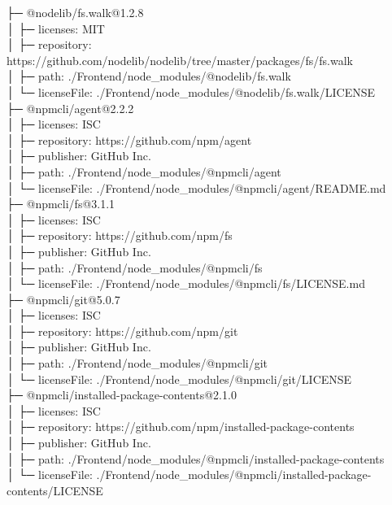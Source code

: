 \documentclass[
    paper=a4,
    twoside=false,
    parskip=half,
    listof=entryprefix,
    listof=totoc,
    index=totoc,
    bibliography=totoc,
    headsepline,
]{scrbook}
\begin{document}
    ├─ @nodelib/fs.walk@1.2.8\\
    │  ├─ licenses: MIT\\
    │  ├─ repository: https://github.com/nodelib/nodelib/tree/master/packages/fs/fs.walk\\
    │  ├─ path: ./Frontend/node\_modules/@nodelib/fs.walk\\
    │  └─ licenseFile: ./Frontend/node\_modules/@nodelib/fs.walk/LICENSE\\
    ├─ @npmcli/agent@2.2.2\\
    │  ├─ licenses: ISC\\
    │  ├─ repository: https://github.com/npm/agent\\
    │  ├─ publisher: GitHub Inc.\\
    │  ├─ path: ./Frontend/node\_modules/@npmcli/agent\\
    │  └─ licenseFile: ./Frontend/node\_modules/@npmcli/agent/README.md\\
    ├─ @npmcli/fs@3.1.1\\
    │  ├─ licenses: ISC\\
    │  ├─ repository: https://github.com/npm/fs\\
    │  ├─ publisher: GitHub Inc.\\
    │  ├─ path: ./Frontend/node\_modules/@npmcli/fs\\
    │  └─ licenseFile: ./Frontend/node\_modules/@npmcli/fs/LICENSE.md\\
    ├─ @npmcli/git@5.0.7\\
    │  ├─ licenses: ISC\\
    │  ├─ repository: https://github.com/npm/git\\
    │  ├─ publisher: GitHub Inc.\\
    │  ├─ path: ./Frontend/node\_modules/@npmcli/git\\
    │  └─ licenseFile: ./Frontend/node\_modules/@npmcli/git/LICENSE\\
    ├─ @npmcli/installed-package-contents@2.1.0\\
    │  ├─ licenses: ISC\\
    │  ├─ repository: https://github.com/npm/installed-package-contents\\
    │  ├─ publisher: GitHub Inc.\\
    │  ├─ path: ./Frontend/node\_modules/@npmcli/installed-package-contents\\
    │  └─ licenseFile: ./Frontend/node\_modules/@npmcli/installed-package-contents/LICENSE\\
\end{document}
